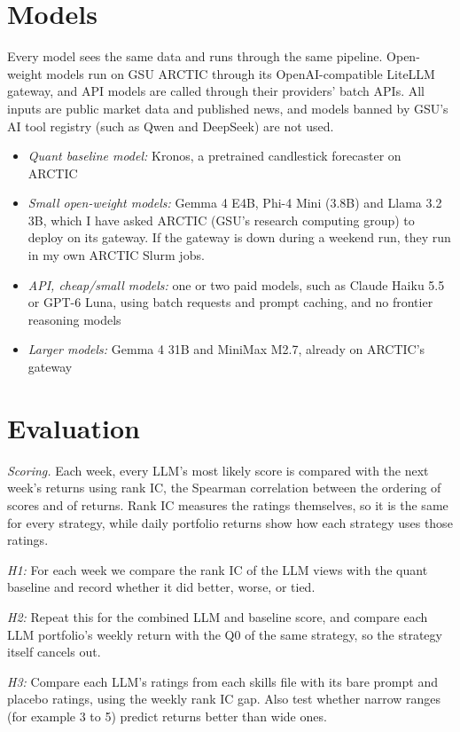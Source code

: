 \documentclass[conference]{IEEEtran}
\begin{document}
\section{Models}
Every model sees the same data and runs through the same pipeline. Open-weight models run on GSU ARCTIC through its OpenAI-compatible LiteLLM gateway, and API models are called through their providers' batch APIs. All inputs are public market data and published news, and models banned by GSU's AI tool registry (such as Qwen and DeepSeek) are not used.
\begin{itemize}
\item \textit{Quant baseline model:} Kronos, a pretrained candlestick forecaster on ARCTIC
\item \textit{Small open-weight models:} Gemma 4 E4B, Phi-4 Mini (3.8B) and Llama 3.2 3B, which I have asked ARCTIC (GSU's research computing group) to deploy on its gateway. If the gateway is down during a weekend run, they run in my own ARCTIC Slurm jobs.
\item \textit{API, cheap/small models:} one or two paid models, such as Claude Haiku 5.5 or GPT-6 Luna, using batch requests and prompt caching, and no frontier reasoning models
\item \textit{Larger models:} Gemma 4 31B and MiniMax M2.7, already on ARCTIC's gateway
\end{itemize}

\section{Evaluation}
\textit{Scoring.} Each week, every LLM's most likely score is compared with the next week's returns using rank IC, the Spearman correlation between the ordering of scores and of returns. Rank IC measures the ratings themselves, so it is the same for every strategy, while daily portfolio returns show how each strategy uses those ratings.

\textit{H1:} For each week we compare the rank IC of the LLM views with the quant baseline and record whether it did better, worse, or tied.

\textit{H2:} Repeat this for the combined LLM and baseline score, and compare each LLM portfolio's weekly return with the Q0 of the same strategy, so the strategy itself cancels out.

\textit{H3:} Compare each LLM's ratings from each skills file with its bare prompt and placebo ratings, using the weekly rank IC gap. Also test whether narrow ranges (for example 3 to 5) predict returns better than wide ones.
\end{document}
